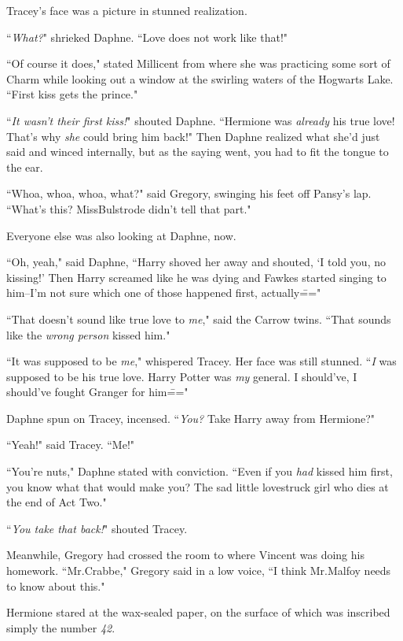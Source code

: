 Tracey's face was a picture in stunned realization.

``\emph{What?}" shrieked Daphne. ``Love does not work like that!"

``Of course it does," stated Millicent from where she was practicing some sort of Charm while looking out a window at the swirling waters of the Hogwarts Lake. ``First kiss gets the prince."

``\emph{It wasn't their first kiss!}" shouted Daphne. ``Hermione was \emph{already} his true love! That's why \emph{she} could bring him back!" Then Daphne realized what she'd just said and winced internally, but as the saying went, you had to fit the tongue to the ear.

``Whoa, whoa, whoa, what?" said Gregory, swinging his feet off Pansy's lap. ``What's this? Miss\?Bulstrode didn't tell that part."

Everyone else was also looking at Daphne, now.

``Oh, yeah," said Daphne, ``Harry shoved her away and shouted, `I told you, no kissing!' Then Harry screamed like he was dying and Fawkes started singing to him\---I'm not sure which one of those happened first, actually\==="

``That doesn't sound like true love to \emph{me}," said the Carrow twins. ``That sounds like the \emph{wrong person} kissed him."

``It was supposed to be \emph{me}," whispered Tracey. Her face was still stunned. ``\emph{I} was supposed to be his true love. Harry Potter was \emph{my} general. I should've, I should've fought Granger for him\==="

Daphne spun on Tracey, incensed. ``\emph{You?} Take Harry away from Hermione?"

``Yeah!" said Tracey. ``Me!"

``You're nuts," Daphne stated with conviction. ``Even if you \emph{had} kissed him first, you know what that would make you? The sad little lovestruck girl who dies at the end of Act Two."

``\emph{You take that back!}" shouted Tracey.

Meanwhile, Gregory had crossed the room to where Vincent was doing his homework. ``Mr.\?Crabbe," Gregory said in a low voice, ``I think Mr.\?Malfoy needs to know about this."


Hermione stared at the wax-sealed paper, on the surface of which was inscribed simply the number \emph{42}.

